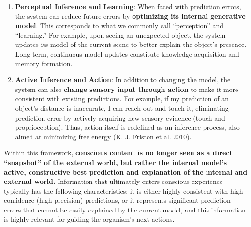 \documentclass[
  a4paper]{article}
\providecommand{\tightlist}{%
  \setlength{\itemsep}{0pt}\setlength{\parskip}{0pt}}
\begin{document}
\begin{enumerate}
  \begin{enumerate}
  \def\labelenumii{\arabic{enumii}.}
  \tightlist
  \item
    \textbf{Perceptual Inference and Learning}: When faced with
    prediction errors, the system can reduce future errors by
    \textbf{optimizing its internal generative model}. This corresponds
    to what we commonly call ``perception'' and ``learning.'' For
    example, upon seeing an unexpected object, the system updates its
    model of the current scene to better explain the object's presence.
    Long-term, continuous model updates constitute knowledge acquisition
    and memory formation.
  \item
    \textbf{Active Inference and Action}: In addition to changing the
    model, the system can also \textbf{change sensory input through
    action} to make it more consistent with existing predictions. For
    example, if my prediction of an object's distance is inaccurate, I
    can reach out and touch it, eliminating prediction error by actively
    acquiring new sensory evidence (touch and proprioception). Thus,
    action itself is redefined as an inference process, also aimed at
    minimizing free energy (K. J. Friston et al. 2010).
  \end{enumerate}

  Within this framework, \textbf{conscious content is no longer seen as
  a direct ``snapshot'' of the external world, but rather the internal
  model's active, constructive best prediction and explanation of the
  internal and external world.} Information that ultimately enters
  conscious experience typically has the following characteristics: it
  is either highly consistent with high-confidence (high-precision)
  predictions, or it represents significant prediction errors that
  cannot be easily explained by the current model, and this information
  is highly relevant for guiding the organism's next actions.


\end{enumerate}
\end{document}
